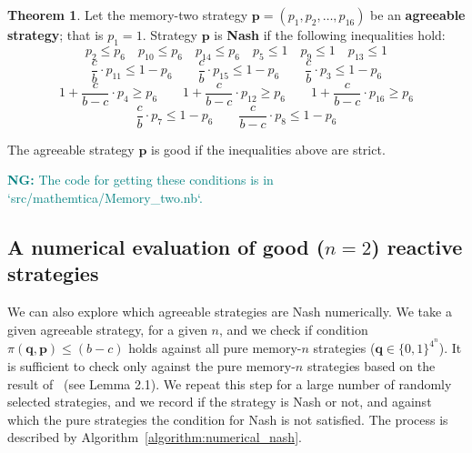 \documentclass{article}
\theoremstyle{definition}
\newtheorem{theorem}{Theorem}[section]
\newcommand{\nikoleta}[1]{\textcolor{teal}{{\bf NG:} #1}}
\begin{document}
\begin{theorem}\label{theorem:memory_two_nash_and_good}
  Let the memory-two strategy \(\mathbf{p} = (p_{1}, p_{2}, \dots, p_{16})\) be an \textbf{agreeable
  strategy}; that is \(p_1 = 1\). Strategy \(\mathbf{p}\) is \textbf{Nash} if the
  following inequalities hold:
  \begin{equation*}
      p_2 \leq  p_{6} \quad p_{10} \leq  p_{6} \quad p_{14} \leq  p_{6}  \quad  p_5 \leq 1 \quad p_9 \leq 1 \quad p_{13}  \leq 1
  \end{equation*}
  \begin{equation*}
  \frac{c}{b} \cdot p_{11} \leq 1 \!- \!p_{6} \qquad \frac{c}{b} \cdot p_{15} \leq 1 \!- \!p_{6}  \qquad \frac{c}{b} \cdot p_{3} \leq 1 \!- \!p_{6}
\end{equation*}
  \begin{equation*}
    1 + \frac{c}{b\!-\!c} \cdot p_{4}  \geq p_6 \qquad  1 + \frac{c}{b\!-\!c} \cdot p_{12}  \geq p_6  \qquad 1 + \frac{c}{b\!-\!c} \cdot p_{16} \geq p_6
  \end{equation*}
  \begin{equation*}
        \frac{c}{b} \cdot p_{7} \leq 1 \!- \!p_6  \qquad \frac{c}{b -c} \cdot p_{8} \leq 1 \!- \!p_6
  \end{equation*}

  The agreeable strategy \(\mathbf{p}\) is good if the inequalities above are strict.
\end{theorem}

\nikoleta{The code for getting these conditions is in `src/mathemtica/Memory\_two.nb`.}

\subsection{A numerical evaluation of good (\(n=2\)) reactive strategies}\label{section:good_strategies_numerically}

We can also explore which agreeable strategies are Nash numerically. We take a
given agreeable strategy, for a given \(n\), and we check if condition
\(\pi({\mathbf{q}}, \mathbf{p}) \leq (b\!-\!c)\) holds against all pure
memory-\(n\) strategies (\(\mathbf{q} \in \{0, 1\}^{4 ^ n}\)). It is
sufficient to check only against the pure memory-\(n\) strategies based on the
result of~\citep{mcavoy:PRSA:2019} (see Lemma 2.1). We repeat this step for a
large number of randomly selected strategies, and we record if the strategy is
Nash or not, and against which the pure strategies the condition for Nash is not
satisfied. The process is described by Algorithm~\ref{algorithm:numerical_nash}.
\end{document}
